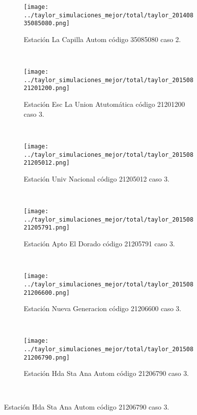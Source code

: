\begin{figure}[H]
\centering
\begin{subfigure}[normla]{0.4\textwidth}
\texttt{[image: ../taylor\_simulaciones\_mejor/total/taylor\_20140835085080.png]}
\caption{Estación La Capilla Autom código 35085080 caso 2.}
\end{subfigure}
~
\begin{subfigure}[normla]{0.4\textwidth}
\texttt{[image: ../taylor\_simulaciones\_mejor/total/taylor\_20150821201200.png]}
\caption{Estación Esc La Union Atutomática código 21201200 caso 3.}
\end{subfigure}
~
\begin{subfigure}[normla]{0.4\textwidth}
\texttt{[image: ../taylor\_simulaciones\_mejor/total/taylor\_20150821205012.png]}
\caption{Estación Univ Nacional código 21205012 caso 3.}
\end{subfigure}
~
\begin{subfigure}[normla]{0.4\textwidth}
\texttt{[image: ../taylor\_simulaciones\_mejor/total/taylor\_20150821205791.png]}
\caption{Estación Apto El Dorado código 21205791 caso 3.}
\end{subfigure}
~
\begin{subfigure}[normla]{0.4\textwidth}
\texttt{[image: ../taylor\_simulaciones\_mejor/total/taylor\_20150821206600.png]}
\caption{Estación Nueva Generacion código 21206600 caso 3.}
\end{subfigure}
~
\begin{subfigure}[normla]{0.4\textwidth}
\texttt{[image: ../taylor\_simulaciones\_mejor/total/taylor\_20150821206790.png]}
\caption{Estación Hda Sta Ana Autom código 21206790 caso 3.}
\end{subfigure}
~
\end{figure}
 
